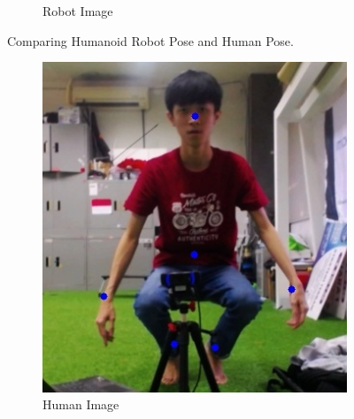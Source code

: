\begin{figure}
\begin{subfigure}[b]{0.4\textwidth}
      \caption{Robot Image}
      \label{fig:robotimagea}
  \end{subfigure}
     \caption{Comparing Humanoid Robot Pose and Human Pose.}
     \label{fig:comparinga}
\end{figure}

\begin{figure}
  \centering
  \begin{subfigure}[b]{0.4\textwidth}
      \centering
      \includegraphics[width=\textwidth]{gambar/human_6_result.jpg}
      \caption{Human Image}
      \label{fig:humanimageb}
  \end{subfigure}
  \hfill
  \begin{subfigure}[b]{0.4\textwidth}
      \centering

\end{subfigure}
\end{figure}
